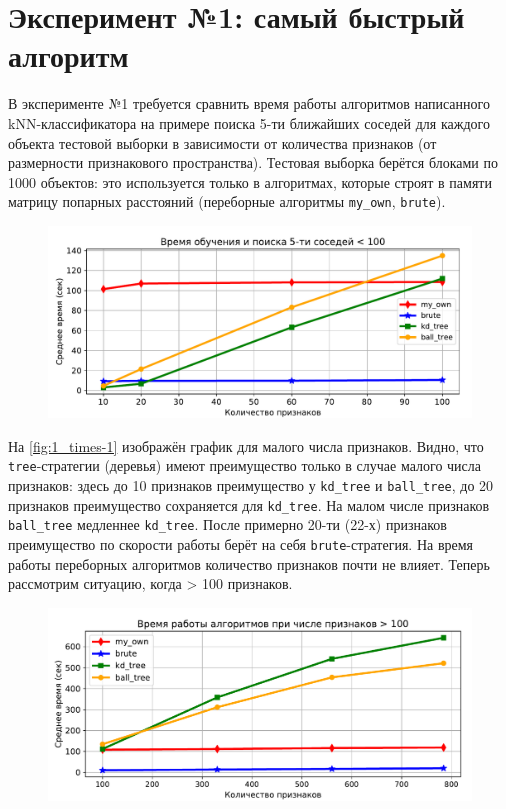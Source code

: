 \documentclass[12pt]{article}
\begin{document}
\section{Эксперимент №1: самый быстрый алгоритм}
В эксперименте №1 требуется сравнить время работы алгоритмов написанного kNN-классификатора на примере поиска 5-ти ближайших соседей для каждого объекта тестовой выборки в зависимости от количества признаков (от размерности признакового пространства). Тестовая выборка берётся блоками по 1000 объектов: это используется только в алгоритмах, которые строят в памяти матрицу попарных расстояний (переборные алгоритмы \verb|my_own|, \verb|brute|). 

\begin{figure}[!h]
    \includegraphics[width=\textwidth]{1_times-1.pdf}
    \caption{}
    \label{fig:1_times-1}
\end{figure}

На \autoref{fig:1_times-1} изображён график для малого числа признаков. Видно, что \verb|tree|-стратегии (деревья) имеют преимущество только в случае малого числа признаков: здесь до 10 признаков преимущество у \verb|kd_tree| и \verb|ball_tree|, до 20 признаков преимущество сохраняется для \verb|kd_tree|. На малом числе признаков \verb|ball_tree| медленнее \verb|kd_tree|. После примерно 20-ти (22-х) признаков преимущество по скорости работы берёт на себя \verb|brute|-стратегия. На время работы переборных алгоритмов количество признаков почти не влияет. Теперь рассмотрим ситуацию, когда > 100 признаков.

\begin{figure}[!h]
    \includegraphics[width=\textwidth]{1_times-2.pdf}
    \caption{}
    \label{fig:1_times-2}
\end{figure}
\end{document}
